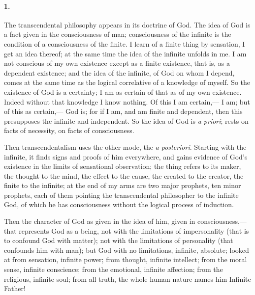 \documentclass[12pt]{article}
\begin{document}
\paragraph{1.} The transcendental philosophy appears in its doctrine of God. The idea of God is a fact given in the consciousness of man; consciousness of the infinite is the condition of a consciousness of the finite. I learn of a finite thing by sensation, I get an idea thereof; at the same time the idea of the infinite unfolds in me. I am not conscious of my own existence except as a finite existence, that is, as a dependent existence; and the idea of the infinite, of God on whom I depend, comes at the same time as the logical correlative of a knowledge of myself. So the existence of God is a certainty; I am as certain of that as of my own existence. Indeed without that knowledge I know nothing. Of this I am certain,--- I am; but of this as certain,--- God is; for if I am, and am finite and dependent, then this presupposes the infinite and independent. So the idea of God is \emph{a priori}; rests on facts of necessity, on facts of consciousness. 

Then transcendentalism uses the other mode, the \emph{a posteriori}. Starting with the infinite, it finds signs and proofs of him everywhere, and gains evidence of God's existence in the limits of sensational observation; the thing refers to its maker, the thought to the mind, the effect to the cause, the created to the creator, the finite to the infinite; at the end of my arms are two major prophets, ten minor prophets, each of them pointing the transcendental philosopher to the infinite God, of which he has consciousness without the logical process of induction. 

Then the character of God as given in the idea of him, given in consciousness,--- that represents God as a being, not with the limitations of impersonality (that is to confound God with matter); not with the limitations of personality (that confounds him with man); but God with no limitations, infinite, absolute; looked at from sensation, infinite power; from thought, infinite intellect; from the moral sense, infinite conscience; from the emotional, infinite affection; from the religious, infinite soul; from all truth, the whole human nature names him Infinite Father! 
\end{document}
